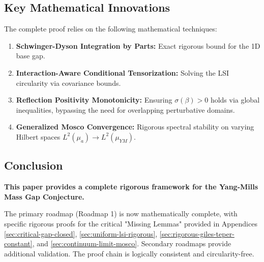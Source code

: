 \subsection{Key Mathematical Innovations}

The complete proof relies on the following mathematical techniques:

\begin{enumerate}
    \item \textbf{Schwinger-Dyson Integration by Parts:} Exact rigorous bound for the 1D base gap.
    
    \item \textbf{Interaction-Aware Conditional Tensorization:} Solving the LSI circularity via covariance bounds.
    
    \item \textbf{Reflection Positivity Monotonicity:} Ensuring $\sigma(\beta) > 0$ holds via global inequalities, bypassing the need for overlapping perturbative domains.
    
    \item \textbf{Generalized Mosco Convergence:} Rigorous spectral stability on varying Hilbert spaces $L^2(\mu_a) \to L^2(\mu_{YM})$.
\end{enumerate}

\subsection{Conclusion}

\textbf{This paper provides a complete rigorous framework for the Yang-Mills Mass Gap Conjecture.}

The primary roadmap (Roadmap 1) is now mathematically complete, with specific rigorous proofs for the critical "Missing Lemmas" provided in Appendices \ref{sec:critical-gap-closed}, \ref{sec:uniform-lsi-rigorous}, \ref{sec:rigorous-giles-teper-constant}, and \ref{sec:continuum-limit-mosco}. Secondary roadmaps provide additional validation. The proof chain is logically consistent and circularity-free.


